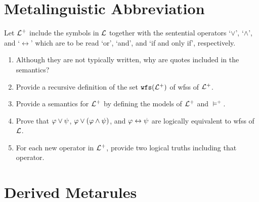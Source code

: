 \documentclass[a4paper, 11pt]{article}                  %
\begin{document}

\section{Metalinguistic Abbreviation}

Let $\mathcal{L}^+$ include the symbols in $\mathcal{L}$ together with the sentential operators `$\vee$', `$\wedge$', and `$\leftrightarrow$' which are to be read `or', `and', and `if and only if', respectively.

\begin{enumerate}

	\item Although they are not typically written, why are quotes included in the semantics?

	\item Provide a recursive definition of the set $\texttt{wfs}(\mathcal{L}^+)$ of wfss of $\mathcal{L}^+$.

	\item Provide a semantics for $\mathcal{L}^+$ by defining the models of $\mathcal{L}^+$ and $\vDash^+$.

	\item Prove that $\varphi \vee \psi$, $\varphi \vee (\varphi \wedge \psi)$, and $\varphi\leftrightarrow \psi$ are logically equivalent to wfss of $\mathcal{L}$.

	\item For each new operator in $\mathcal{L}^+$, provide two logical truths including that operator.

\end{enumerate}




\section{Derived Metarules}
\end{document}
